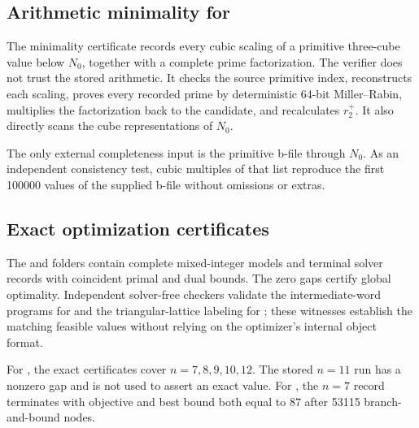 \subsection{Arithmetic minimality for \texorpdfstring{}{A273354}}

The minimality certificate records every cubic scaling of a primitive
three-cube value below \(N_0\), together with a complete prime factorization.
The verifier does not trust the stored arithmetic.  It checks the source
primitive index, reconstructs each scaling, proves every recorded prime by
deterministic 64-bit Miller--Rabin, multiplies the factorization back to the
candidate, and recalculates \(r_2^+\).  It also directly scans the cube
representations of \(N_0\).

The only external completeness input is the primitive  b-file
through \(N_0\).  As an independent consistency test, cubic multiples of that
list reproduce the first 100000 values of the supplied  b-file
without omissions or extras.

\subsection{Exact optimization certificates}

The  and  folders contain complete mixed-integer
models and terminal solver records with coincident primal and dual bounds.
The zero gaps certify global optimality.  Independent solver-free checkers
validate the intermediate-word programs for  and the
triangular-lattice labeling for ; these witnesses establish the
matching feasible values without relying on the optimizer's internal object
format.

For , the exact certificates cover \(n=7,8,9,10,12\).  The stored
\(n=11\) run has a nonzero gap and is not used to assert an exact value.  For
, the \(n=7\) record terminates with objective and best bound both
equal to 87 after 53115 branch-and-bound nodes.
